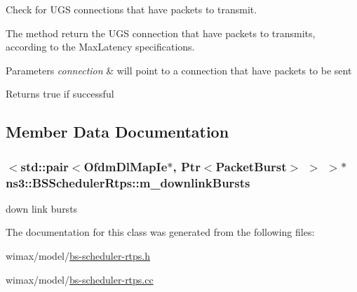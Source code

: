 Check for U\+GS connections that have packets to transmit. 

The method return the U\+GS connection that have packets to transmits, according to the Max\+Latency specifications. 
\begin{DoxyParams}{Parameters}
{\em connection} & will point to a connection that have packets to be sent \\
\hline
\end{DoxyParams}
\begin{DoxyReturn}{Returns}
true if successful 
\end{DoxyReturn}


\subsection{Member Data Documentation}
\subsubsection[{\texorpdfstring{m\+\_\+downlink\+Bursts}{m_downlinkBursts}}]{$<$std\+::pair$<${\bf Ofdm\+Dl\+Map\+Ie}$\ast$, {\bf Ptr}$<${\bf Packet\+Burst}$>$ $>$ $>$$\ast$ ns3\+::\+B\+S\+Scheduler\+Rtps\+::m\+\_\+downlink\+Bursts\hspace{0.3cm}{\ttfamily [private]}}\hypertarget{classns3_1_1BSSchedulerRtps_afd2e36f0462940e88519935b9df6a6ca}{}\label{classns3_1_1BSSchedulerRtps_afd2e36f0462940e88519935b9df6a6ca}


down link bursts 



The documentation for this class was generated from the following files\+:\begin{DoxyCompactItemize}
\item 
wimax/model/\hyperlink{bs-scheduler-rtps_8h}{bs-\/scheduler-\/rtps.\+h}\item 
wimax/model/\hyperlink{bs-scheduler-rtps_8cc}{bs-\/scheduler-\/rtps.\+cc}\end{DoxyCompactItemize}
